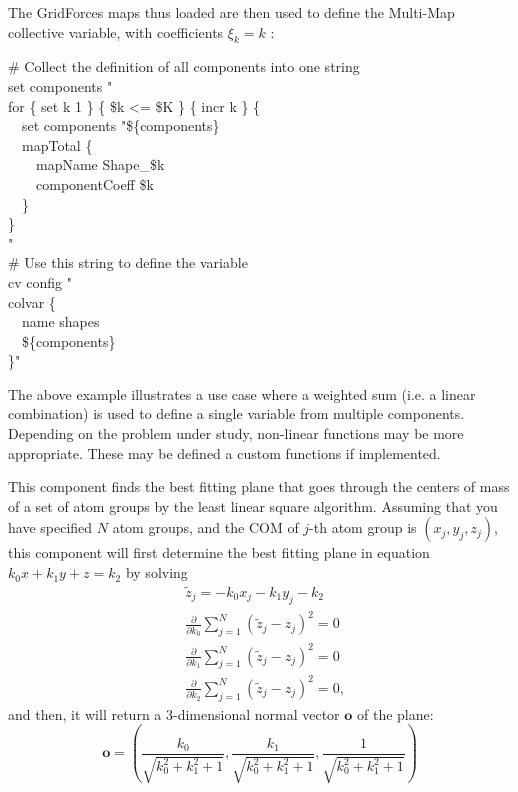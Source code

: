 {The GridForces maps thus loaded are then used to define the Multi-Map collective variable, with coefficients $\xi_k = k$ \cite{Fiorin2020}:\\
\begin{mdexampleinput}
  \-\# Collect the definition of all components into one string\\
  \-set components "\\
  \-for \{ set k 1 \} \{ \$k <= \$K \} \{ incr k \} \{\\
  \-~~set components "\$\{components\}\\
  \-~~mapTotal \{\\
  \-~~~~mapName Shape\_\$k\\
  \-~~~~componentCoeff \$k\\
  \-~~\}\\
  \-\}\\
  \-"\\
  \-\# Use this string to define the variable\\
  \-cv config "\\
  \-colvar \{\\
  \-\-~~name shapes\\
  \-\-~~\$\{components\}\\
  \-\}"
\end{mdexampleinput}

The above example illustrates a use case where a weighted sum (i.e.{} a linear combination) is used to define a single variable from multiple components.
Depending on the problem under study, non-linear functions may be more appropriate.
These may be defined a custom functions if implemented.

}\fi %



This component finds the best fitting plane that goes through the centers of 
mass of a set of atom groups by the least linear square algorithm. Assuming 
that you have specified $N$ atom groups, and the COM of $j$-th atom group is 
$(x_j,y_j,z_j)$, this component will first determine the best fitting plane in 
equation $k_0 x + k_1 y + z = k_2$ by solving
\begin{equation}
\begin{aligned} 
	&\tilde{z}_j = -k_0 x_j - k_1 y_j - k_2\\
	&\frac{\partial}{\partial k_0}\sum_{j=1}^{N}(\tilde{z}_j-z_j)^2=0\\
	&\frac{\partial}{\partial k_1}\sum_{j=1}^{N}(\tilde{z}_j-z_j)^2=0\\
	&\frac{\partial}{\partial k_2}\sum_{j=1}^{N}(\tilde{z}_j-z_j)^2=0,
\end{aligned}
\end{equation}
and then, it will return a 3-dimensional normal vector $\mathbf{o}$ of the 
plane:
\begin{equation}
	\mathbf{o}=\left(\frac{k_0}{\sqrt{k_0^2+k_1^2+1}}, 
	\frac{k_1}{\sqrt{k_0^2+k_1^2+1}}, \frac{1}{\sqrt{k_0^2+k_1^2+1}}\right)
\end{equation}

